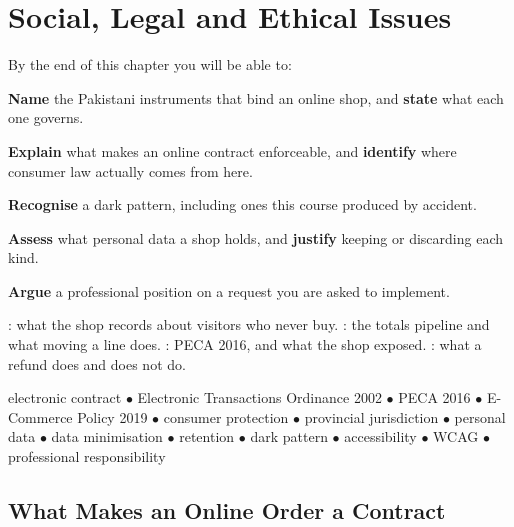 \chapter{Social, Legal and Ethical Issues}\label{ch:legal}

\begin{outcomes}
By the end of this chapter you will be able to:
\begin{tight}
  \item \textbf{Name} the Pakistani instruments that bind an online shop, and
        \textbf{state} what each one governs.
  \item \textbf{Explain} what makes an online contract enforceable, and
        \textbf{identify} where consumer law actually comes from here.
  \item \textbf{Recognise} a dark pattern, including ones this course produced
        by accident.
  \item \textbf{Assess} what personal data a shop holds, and \textbf{justify}
        keeping or discarding each kind.
  \item \textbf{Argue} a professional position on a request you are asked to
        implement.
\end{tight}
\end{outcomes}

\begin{prereq}
: what the shop records about visitors who never buy.
: the totals pipeline and what moving a line does.
: PECA 2016, and what the shop exposed. : what a
refund does and does not do.
\end{prereq}

\begin{keyterms}
electronic contract $\bullet$ Electronic Transactions Ordinance 2002 $\bullet$
PECA 2016 $\bullet$ E-Commerce Policy 2019 $\bullet$ consumer protection
$\bullet$ provincial jurisdiction $\bullet$ personal data $\bullet$ data
minimisation $\bullet$ retention $\bullet$ dark pattern $\bullet$ accessibility
$\bullet$ WCAG $\bullet$ professional responsibility
\end{keyterms}

\section{What Makes an Online Order a Contract}

